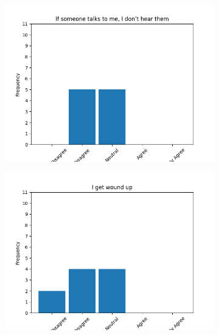 \documentclass{article}
\begin{document}
\begin{figure}[!ht]
\begin{subfigure}{.5\textwidth}
\end{subfigure}%
\begin{subfigure}{.5\textwidth}
    \centering
    \includegraphics[width=\textwidth]{images/questions/5}
\end{subfigure}
\begin{subfigure}{.5\textwidth}
    \centering
    \includegraphics[width=\textwidth]{images/questions/6}
\end{subfigure}%
\begin{subfigure}{.5\textwidth}
    \centering

\end{subfigure}
\end{figure}
\end{document}
